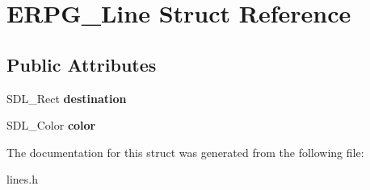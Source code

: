 \hypertarget{structERPG__Line}{\section{E\-R\-P\-G\-\_\-\-Line Struct Reference}
\label{structERPG__Line}
}
\subsection*{Public Attributes}
\begin{DoxyCompactItemize}
\item 
\hypertarget{structERPG__Line_a32a95f7c8079d993e67d2f4969a02d9f}{S\-D\-L\-\_\-\-Rect {\bfseries destination}}\label{structERPG__Line_a32a95f7c8079d993e67d2f4969a02d9f}

\item 
\hypertarget{structERPG__Line_a369d09d87538ef5a539a1c6def2246e9}{S\-D\-L\-\_\-\-Color {\bfseries color}}\label{structERPG__Line_a369d09d87538ef5a539a1c6def2246e9}

\end{DoxyCompactItemize}


The documentation for this struct was generated from the following file\-:\begin{DoxyCompactItemize}
\item 
lines.\-h\end{DoxyCompactItemize}
